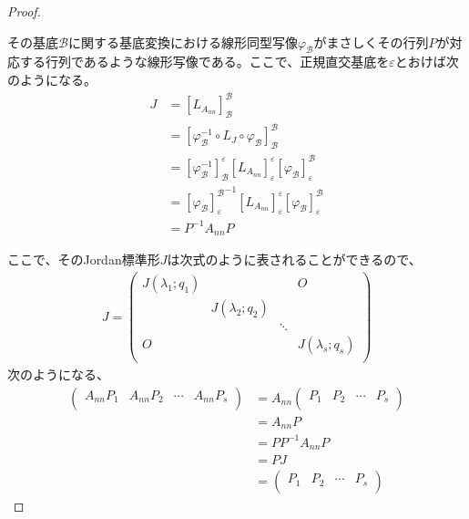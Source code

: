 \documentclass[dvipdfmx]{jsarticle}
\begin{document}
\begin{proof}
\begin{center}
\begin{tikzpicture}[auto]
  \end{tikzpicture} 
\end{center}
その基底$\mathcal{B}$に関する基底変換における線形同型写像$\varphi_{\mathcal{B}}$がまさしくその行列$P$が対応する行列であるような線形写像である。ここで、正規直交基底を$\varepsilon$とおけば次のようになる。
\begin{align*}
J &= \left[ L_{A_{nn}} \right]_{\mathcal{B}}^{\mathcal{B}}\\
&= \left[ \varphi_{\mathcal{B}}^{- 1} \circ L_{J} \circ \varphi_{\mathcal{B}} \right]_{\mathcal{B}}^{\mathcal{B}}\\
&= \left[ \varphi_{\mathcal{B}}^{- 1} \right]_{\mathcal{B}}^{\varepsilon}\left[ L_{A_{nn}} \right]_{\varepsilon}^{\varepsilon}\left[ \varphi_{\mathcal{B}} \right]_{\varepsilon}^{\mathcal{B}}\\
&= {\left[ \varphi_{\mathcal{B}} \right]_{\varepsilon}^{\mathcal{B}}}^{- 1}\left[ L_{A_{nn}} \right]_{\varepsilon}^{\varepsilon}\left[ \varphi_{\mathcal{B}} \right]_{\varepsilon}^{\mathcal{B}}\\
&= P^{- 1}A_{nn}P
\end{align*}\par
ここで、そのJordan標準形$J$は次式のように表されることができるので、
\begin{align*}
J = \begin{pmatrix}
J\left( \lambda_{1};q_{1} \right) & \  & \  & O \\
\  & J\left( \lambda_{2};q_{2} \right) & \  & \  \\
\  & \  & \ddots & \  \\
O & \  & \  & J\left( \lambda_{s};q_{s} \right) \\
\end{pmatrix}
\end{align*}
次のようになる、
\begin{align*}
\begin{pmatrix}
A_{nn}P_{1} & A_{nn}P_{2} & \cdots & A_{nn}P_{s} \\
\end{pmatrix} &= A_{nn}\begin{pmatrix}
P_{1} & P_{2} & \cdots & P_{s} \\
\end{pmatrix}\\
&= A_{nn}P\\
&= PP^{- 1}A_{nn}P\\
&= PJ\\
&= \begin{pmatrix}
P_{1} & P_{2} & \cdots & P_{s} \\

\end{pmatrix}
\end{align*}
\end{proof}
\end{document}
